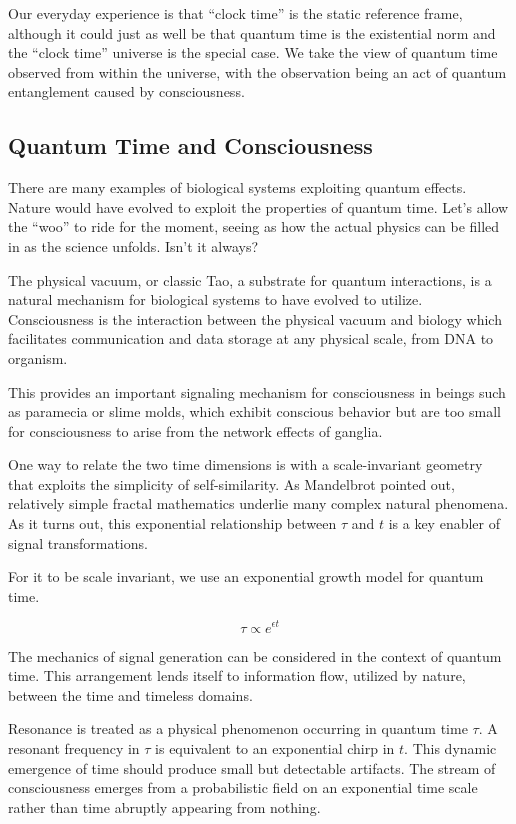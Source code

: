 Our everyday experience is that ``clock time'' is the static reference frame,
although it could just as well be that quantum time is the existential norm
and the ``clock time'' universe is the special case.
We take the view of quantum time observed from within the universe, with
the observation being an act of quantum entanglement caused by consciousness.

\subsection{Quantum Time and Consciousness}

There are many examples of biological systems exploiting quantum effects.
Nature would have evolved to exploit the properties of quantum time.
Let's allow the ``woo'' to ride for the moment, seeing as how the actual
physics can be filled in as the science unfolds. Isn't it always?

The physical vacuum, or classic Tao, a substrate for quantum interactions,
is a natural mechanism for biological systems to have evolved to utilize.
Consciousness is the interaction between the physical vacuum and biology which
facilitates communication and data storage at any physical scale,
from DNA to organism.

This provides an important signaling mechanism for consciousness in beings such
as paramecia or slime molds, which exhibit conscious behavior but are too small
for consciousness to arise from the network effects of ganglia.

One way to relate the two time dimensions is with a scale-invariant geometry
that exploits the simplicity of self-similarity.
As Mandelbrot \cite{Mandelbrot} pointed out, relatively simple fractal
mathematics underlie many complex natural phenomena.
As it turns out, this exponential relationship between $\tau$ and $t$
is a key enabler of signal transformations.

For it to be scale invariant,
we use an exponential growth model for quantum time.

\begin{equation} \label{eq:pink}
\tau \propto e^{\epsilon t}
\end{equation}

The mechanics of signal generation can be considered in the context of
quantum time.
This arrangement lends itself to information flow, utilized by nature,
between the time and timeless domains.

Resonance is treated as a physical phenomenon occurring in quantum time $\tau$.
A resonant frequency in $\tau$ is equivalent to an exponential chirp in $t$.
This dynamic emergence of time should produce small but detectable artifacts.
The stream of consciousness emerges from a probabilistic field on an
exponential time scale rather than time abruptly appearing from nothing.


